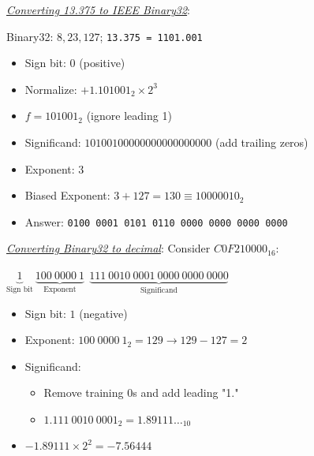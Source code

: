 \documentclass[a4paper]{article}
\begin{document}
\begin{multicols*}{2}
  \underline{\textit{Converting 13.375 to IEEE Binary32}}:

  Binary32: $8,23,127$; \texttt{13.375 = 1101.001}
  \begin{itemize}
    \item Sign bit: $0$ (positive)
    \item Normalize: $+1.101001_2 \times 2^3$
    \item $f=101001_2$ (ignore leading 1)
    \item Significand: $10100100000000000000000$ (add trailing zeros)
    \item Exponent: $3$
    \item Biased Exponent: $3+127=130 \equiv 10000010_2$
    \item Answer: \texttt{0100 0001 0101 0110 0000 0000 0000 0000}
  \end{itemize}


  \underline{\textit{Converting Binary32 to decimal}}:
  Consider $C0F210000_{16}$:

  $
    \underbrace{1}_{\text{Sign bit}}\ \underbrace{100\ 0000\ 1}_{\text{Exponent}}\ \ \underbrace{111\ 0010\ 0001\ 0000\ 0000\ 0000}_{\text{Significand}}
  $
  \begin{itemize}
    \item Sign bit: $1$ (negative)
    \item Exponent: $100\ 0000\ 1_2 = 129 \rightarrow 129-127=2$
    \item Significand:
          \begin{itemize}
            \item Remove training 0s and add leading "1."
            \item $1.111\ 0010\ 0001_2 = 1.89111\dots_{10}$
          \end{itemize}
    \item $-1.89111 \times 2^2 = -7.56444$
  \end{itemize}


\end{multicols*}
\end{document}
